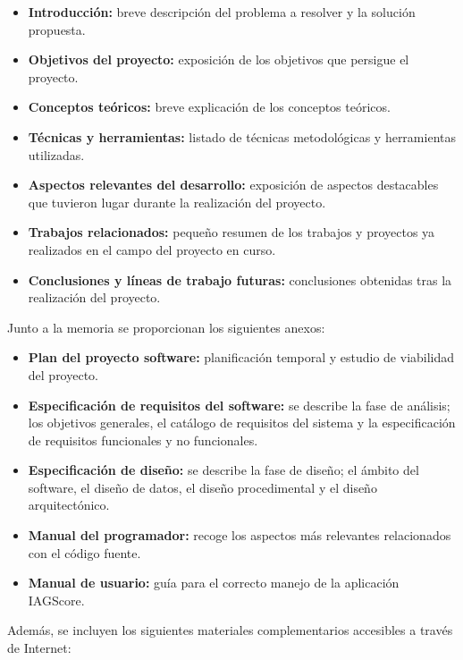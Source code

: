 \begin{itemize}
    \item \textbf{Introducción:} breve descripción del problema a resolver y la solución propuesta.
    \item \textbf{Objetivos del proyecto:} exposición de los objetivos que persigue el proyecto.
    \item \textbf{Conceptos teóricos:} breve explicación de los conceptos teóricos.
    \item \textbf{Técnicas y herramientas:} listado de técnicas metodológicas y herramientas utilizadas.
    \item \textbf{Aspectos relevantes del desarrollo:} exposición de aspectos destacables que tuvieron lugar durante la realización del proyecto.
    \item \textbf{Trabajos relacionados:} pequeño resumen de los trabajos y proyectos ya realizados en el campo del proyecto en curso.
    \item \textbf{Conclusiones y líneas de trabajo futuras:} conclusiones obtenidas tras la realización del proyecto.
\end{itemize}

Junto a la memoria se proporcionan los siguientes anexos:

\begin{itemize}
    \item \textbf{Plan del proyecto software:} planificación temporal y estudio de viabilidad del proyecto.
    \item \textbf{Especificación de requisitos del software:} se describe la fase de análisis; los objetivos generales, el catálogo de requisitos del sistema y la especificación de requisitos funcionales y no funcionales.
    \item \textbf{Especificación de diseño:} se describe la fase de diseño; el ámbito del software, el diseño de datos, el diseño procedimental y el diseño arquitectónico.
    \item \textbf{Manual del programador:} recoge los aspectos más relevantes relacionados con el código fuente.
    \item \textbf{Manual de usuario:} guía para el correcto manejo de la aplicación IAGScore.
\end{itemize}

Además, se incluyen los siguientes materiales complementarios accesibles a través de Internet:

